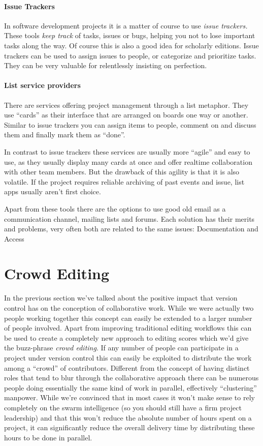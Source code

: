 \documentclass[11pt,a4paper]{article}
\begin{document}
\paragraph{Issue Trackers}
In software development projects it is a matter of course to use \emph{issue trackers.}
These tools \emph{keep track} of tasks, issues or bugs, helping you not to lose important
tasks along the way. Of course this is also a good idea for scholarly editions. Issue
trackers can be used to assign issues to people, or categorize and prioritize tasks.
They can be very valuable for relentlessly insisting on perfection.

\paragraph{List service providers}
There are services offering project management through a list metaphor. They use “cards”
as their interface that are arranged on boards one way or another. Similar to issue trackers
you can assign items to people, comment on and discuss them and finally mark them as “done”.

In contrast to issue trackers these services are usually more “agile” and easy to use, as
they usually display many cards at once and offer realtime collaboration with other
team members. But the drawback of this agility is that it is also volatile. If the project
requires reliable archiving of past events and issue, list apps usually aren't first choice.

\medskip
Apart from these tools there are the options to use good old email as a communication channel, mailing lists and forums. Each solution has their merits and problems, very often both are related to the same issues: Documentation and Access


\section{Crowd Editing}
In the previous section we've talked about the positive impact that version control
has on the conception of collaborative work. While we were actually two people
working together this concept can easily be extended to a larger number of people
involved. Apart from improving traditional editing workflows this can be used to create a
completely new approach to editing scores which we'd give the buzz-phrase \emph{crowd
editing}. If any number of people can participate in a project under version control
this can easily be exploited to distribute the work among a “crowd” of contributors.
Different from the concept of having distinct roles that tend to blur through the
collaborative approach there can be numerous people doing essentially the same kind
of work in parallel, effectively “clustering” manpower. While we're convinced that
in most cases it won't make sense to rely completely on the swarm intelligence (so
you should still have a firm project leadership) and that this won't reduce the
absolute number of hours spent on a project, it can significantly reduce the overall
delivery time by distributing these hours to be done in parallel.
\end{document}
